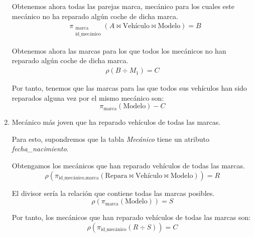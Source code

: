 \begin{ejercicio}
\begin{enumerate}
        Obtenemos ahora todas las parejas marca, mecánico para los cuales este mecánico no ha reparado algún coche de dicha marca.
        \begin{align*}
            &\pi_{\substack{\text{marca}\\\text{id\_mecánico}}}(A\bowtie \text{Vehículo} \bowtie \text{Modelo})=B
        \end{align*}

        Obtenemos ahora las marcas para los que todos los mecánicos no han reparado algún coche de dicha marca.
        \begin{align*}
            \rho\left(B\div M_1\right)=C
        \end{align*}

        Por tanto, tenemos que las marcas para las que todos sus vehículos han sido reparados alguna vez por el mismo mecánico son:
        \begin{equation*}
            \pi_{\text{marca}}(\text{Modelo})-C
        \end{equation*}
        \item Mecánico más joven que ha reparado vehículos de todas las marcas.
        
        \begin{observacion}
            Para esto, supondremos que la tabla \emph{Mecánico} tiene un atributo \emph{fecha\_nacimiento}.
        \end{observacion}
        
        Obtengamos los mecánicos que han reparado vehículos de todas las marcas.
        \begin{equation*}
            \rho\left(\pi_{\text{id\_mecánico},\text{marca}}(\text{Repara}\bowtie \text{Vehículo}\bowtie \text{Modelo})\right) = R
        \end{equation*}

        El divisor sería la relación que contiene todas las marcas posibles.
        \begin{equation*}
            \rho(\pi_{\text{marca}}(\text{Modelo})) = S
        \end{equation*}

        Por tanto, los mecánicos que han reparado vehículos de todas las marcas son:
        \begin{equation*}
            \rho(\pi_{\text{id\_mecánico}}(R \div S))=C
        \end{equation*}


\end{enumerate}
\end{ejercicio}
